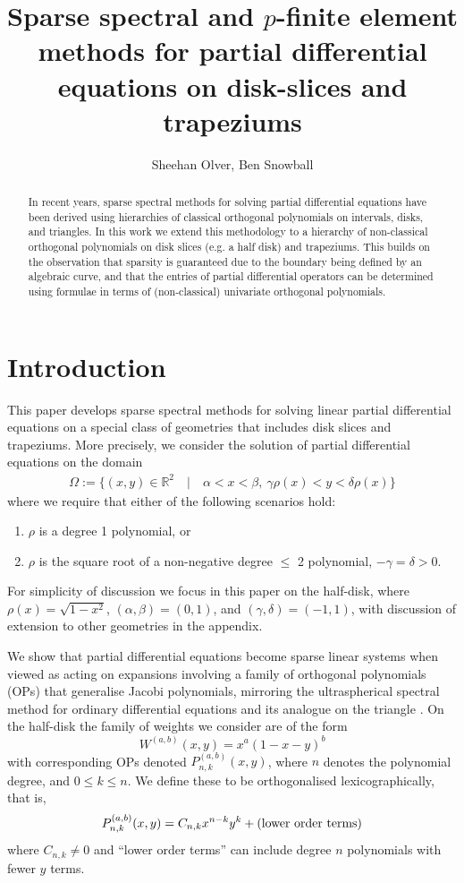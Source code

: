 \documentclass[11pt, oneside]{article}   	%
\title{Sparse spectral and $p$-finite element methods for partial differential equations on disk-slices and trapeziums}
\author{Sheehan Olver, Ben Snowball}
\newcommand{\R}{\mathbb{R}}
\begin{document}
\maketitle

\begin{abstract}
In recent years, sparse spectral methods for solving partial differential equations have been derived using hierarchies of classical orthogonal polynomials on intervals, disks, and triangles. In this work we extend this methodology to a hierarchy of non-classical orthogonal polynomials on disk slices (e.g. a half disk) and trapeziums. This builds on the observation that sparsity is guaranteed due to the boundary being defined by an algebraic curve, and that the entries of partial differential operators can be determined using formulae in terms of (non-classical) univariate orthogonal polynomials. 
\end{abstract}


%
\section{Introduction}

This paper develops sparse spectral methods for solving linear partial differential equations on a special class of geometries that includes disk slices and trapeziums.  
More precisely, we consider the solution of partial differential equations on the domain
\begin{align}
	\Omega := \{(x,y) \in \R^2 \quad | \quad \alpha < x < \beta, \: \gamma \rho(x) < y < \delta \rho(x)\}
\end{align}
where we require that either of the following scenarios hold:
\begin{enumerate}
\item  \(\rho\) is a degree 1 polynomial, or 
\item \(\rho\) is the square root of a non-negative degree \(\le\) 2 polynomial, \(-\gamma = \delta > 0\).
\end{enumerate}

For simplicity of discussion we focus in this paper on the half-disk, where $\rho(x) = \sqrt{1-x^2}$,  $(\alpha,\beta) = (0, 1)$, and  $(\gamma, \delta)  = (-1,1)$, with discussion of extension to other geometries in the appendix. 

We show that partial differential equations become sparse linear systems when viewed as acting on expansions involving a family of orthogonal polynomials (OPs) that  generalise Jacobi polynomials, mirroring the ultraspherical spectral method for ordinary differential equations \cite{olver2013fast} and its analogue on the triangle \cite{olver2018recurrence,olver2019triangle}.  On the half-disk the family of weights we consider are of the form
$$
W^{(a,b)}(x,y) = x^a (1-x-y)^b
$$
with corresponding OPs denoted $P_{n,k}^{(a,b)}(x,y)$, where $n$ denotes the polynomial degree, and $0 \le k \le n$. We define these to be orthogonalised lexicographically, that is,
$$
P_{n,k}^{(a,b)}(x,y) = C_{n,k} x^{n-k} y^k + (\hbox{lower order terms})
$$
where $C_{n,k} \neq 0$ and ``lower order terms'' can  include degree $n$ polynomials with fewer $y$ terms.
\end{document}

